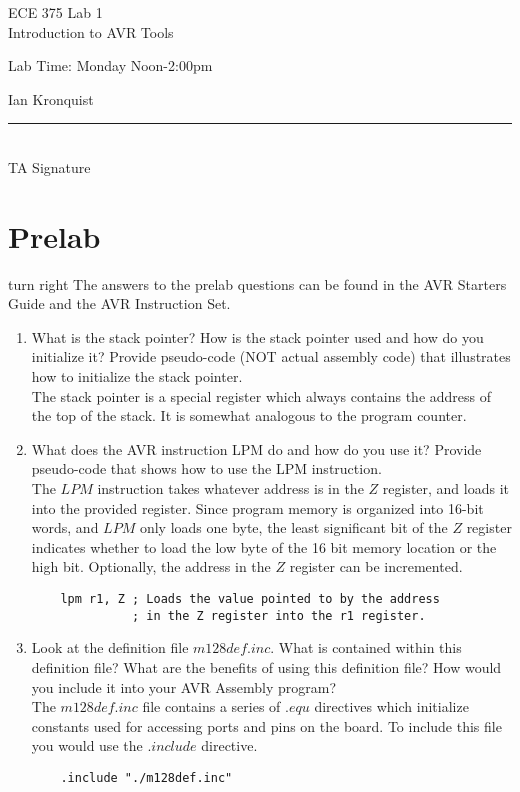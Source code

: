 \documentclass[12pt,letterpaper]{article}
\begin{document}
\begin{titlepage}
    \vspace*{4cm}
    \begin{flushright}
    {\huge
        ECE 375 Lab 1\\[1cm]
    }
    {\large
        Introduction to AVR Tools
    }
    \end{flushright}
    \begin{flushleft}
    Lab Time: Monday Noon-2:00pm
    \end{flushleft}
    \begin{flushright}
    Ian Kronquist
    \vfill
    \rule{5in}{.5mm}\\
    TA Signature
    \end{flushright}

\end{titlepage}

\section{Prelab}
    turn right
The answers to the prelab questions can be found in the AVR Starters Guide and
the AVR Instruction Set.
\begin{enumerate}
    \item What is the stack pointer? How is the stack pointer used and how do
    you initialize it? Provide pseudo-code (NOT actual assembly code) that
    illustrates how to initialize the stack pointer.\\
    The stack pointer is a special register which always contains the address
    of the top of the stack. It is somewhat analogous to the program
    counter.
    \item What does the AVR instruction LPM do and how do you use it? Provide
    pseudo-code that shows how to use the LPM instruction.\\
    The $LPM$ instruction takes whatever address is in the $Z$ register, and
    loads it into the provided register. Since program memory is organized into
    16-bit words, and $LPM$ only loads one byte, the least significant bit of
    the $Z$ register indicates whether to load the low byte of the 16 bit
    memory location or the high bit. Optionally, the address in the $Z$
    register can be incremented.
    \begin{verbatim}
    lpm r1, Z ; Loads the value pointed to by the address 
              ; in the Z register into the r1 register.
    \end{verbatim}
    \item Look at the definition file $m128def.inc$. What is contained within
    this definition file? What are the benefits of using this definition file?
    How would you include it into your AVR Assembly program?\\
    The $m128def.inc$ file contains a series of $.equ$ directives which
    initialize constants used for accessing ports and pins on the board.
    To include this file you would use the $.include$ directive.
    \begin{verbatim}
    .include "./m128def.inc"
    \end{verbatim}
\end{enumerate}
\end{document}
